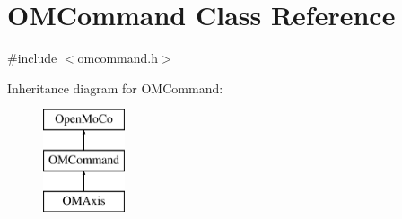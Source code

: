 \hypertarget{class_o_m_command}{
\section{OMCommand Class Reference}
\label{class_o_m_command}
}


{\ttfamily \#include $<$omcommand.h$>$}

Inheritance diagram for OMCommand:\begin{figure}[H]
\begin{center}
\leavevmode
\includegraphics[height=3.000000cm]{class_o_m_command}
\end{center}
\end{figure}
